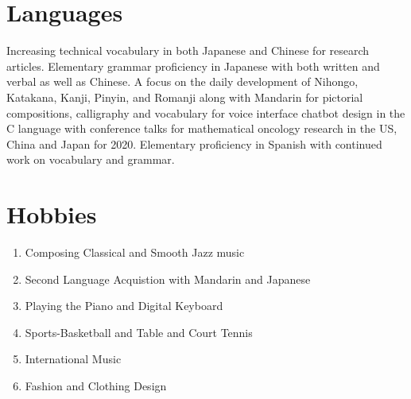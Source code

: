 \documentclass{TMLSStyleGuideResumeVitae}
\begin{document}
\section{Languages}
Increasing technical vocabulary in both Japanese and Chinese for research articles.
Elementary grammar proficiency in Japanese with both written and verbal as well as Chinese.  
A focus on the daily development of Nihongo, Katakana, Kanji, Pinyin, and Romanji along with Mandarin for pictorial
compositions, calligraphy and vocabulary for voice interface chatbot design in the C language with conference talks for mathematical oncology research in the US, China and Japan for 2020.  
Elementary proficiency in Spanish with continued work on vocabulary and grammar.

\section{Hobbies}

\begin{enumerate}
\item Composing Classical and Smooth Jazz music
\item Second Language Acquistion with Mandarin and Japanese
\item Playing the Piano and Digital Keyboard 
\item Sports-Basketball and Table and Court Tennis
\item International Music
\item Fashion and Clothing Design
\end{enumerate}
\end{document}
